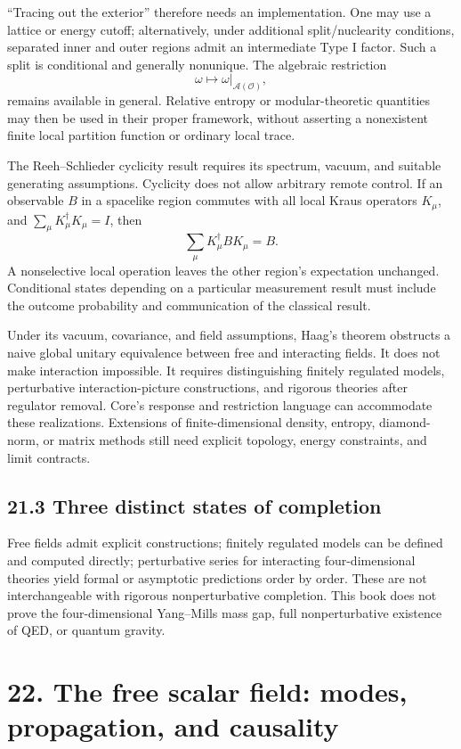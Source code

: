 \documentclass[
  11pt,
  oneside]{book}
\begin{document}
``Tracing out the exterior'' therefore needs an implementation. One may
use a lattice or energy cutoff; alternatively, under additional
split/nuclearity conditions, separated inner and outer regions admit an
intermediate Type I factor. Such a split is conditional and generally
nonunique. The algebraic restriction \[
\omega\longmapsto\omega|_{\mathcal A(\mathcal O)},
\] remains available in general. Relative entropy or modular-theoretic
quantities may then be used in their proper framework, without asserting
a nonexistent finite local partition function or ordinary local trace.

The Reeh--Schlieder cyclicity result requires its spectrum, vacuum, and
suitable generating assumptions. Cyclicity does not allow arbitrary
remote control. If an observable \(B\) in a spacelike region commutes
with all local Kraus operators \(K_\mu\), and
\(\sum_\mu K_\mu^\dagger K_\mu=I\), then \[
\sum_\mu K_\mu^\dagger B K_\mu=B.
\] A nonselective local operation leaves the other region's expectation
unchanged. Conditional states depending on a particular measurement
result must include the outcome probability and communication of the
classical result.

Under its vacuum, covariance, and field assumptions, Haag's theorem
obstructs a naive global unitary equivalence between free and
interacting fields. It does not make interaction impossible. It requires
distinguishing finitely regulated models, perturbative
interaction-picture constructions, and rigorous theories after regulator
removal. Core's response and restriction language can accommodate these
realizations. Extensions of finite-dimensional density, entropy,
diamond-norm, or matrix methods still need explicit topology, energy
constraints, and limit contracts.

\section{21.3 Three distinct states of completion}

Free fields admit explicit constructions; finitely regulated models can
be defined and computed directly; perturbative series for interacting
four-dimensional theories yield formal or asymptotic predictions order
by order. These are not interchangeable with rigorous nonperturbative
completion. This book does not prove the four-dimensional Yang--Mills
mass gap, full nonperturbative existence of QED, or quantum gravity.

\chapter{22. The free scalar field: modes, propagation, and
causality}\label{ch-22}
\end{document}
